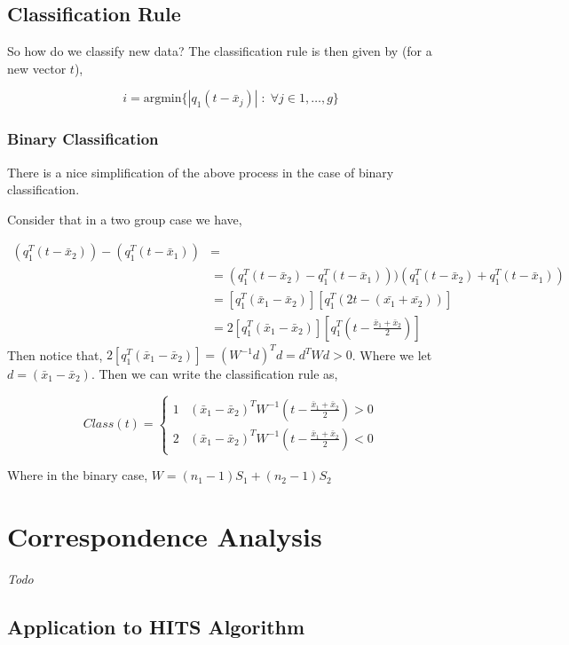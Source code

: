 \documentclass[twoside]{article}
\begin{document}
\subsection{Classification Rule}

So how do we classify new data? The classification rule is then given by (for a new vector $t$),

$$i = \text{argmin}\{|q_1(t-\bar{x}_j)|\;:\;\forall j \in 1,\dots,g\}$$

\subsubsection{Binary Classification}

There is a nice simplification of the above process in the case of binary classification.

Consider that in a two group case we have,

$$\begin{aligned}(q^T_1(t-\bar{x}_2)) - (q^T_1(t-\bar{x}_1)) &= 
\\&= (q_1^T(t-\bar{x}_2) -q_1^T(t-\bar{x}_1)))(q_1^T(t-\bar{x}_2) + q_1^T(t-\bar{x}_1))
\\&= [q_1^T(\bar{x}_1-\bar{x}_2)][q_1^T(2t - (\bar{x_1}+\bar{x_2}))]
\\&= 2[q_1^T(\bar{x}_1-\bar{x}_2)][q_1^T(t-\frac{\bar{x}_1+\bar{x}_2}{2})]
\end{aligned}$$
Then notice that, $2[q_1^T(\bar{x}_1-\bar{x}_2)] = (W^{-1}d)^Td = d^TWd > 0$. Where we let $d=(\bar{x}_1-\bar{x}_2)$. Then we can write the classification rule as,

\begin{equation}Class(t) = \begin{cases}1&(\bar{x}_1-\bar{x}_2)^TW^{-1}(t-\frac{\bar{x}_1+\bar{x}_2}{2}) > 0
\\2&(\bar{x}_1-\bar{x}_2)^TW^{-1}(t-\frac{\bar{x}_1+\bar{x}_2}{2}) < 0
\end{cases}\end{equation}

Where in the binary case, $W = (n_1-1)S_1 + (n_2-1)S_2$

\section{Correspondence Analysis}
\emph{Todo}
\subsection{Application to HITS Algorithm}
\end{document}
